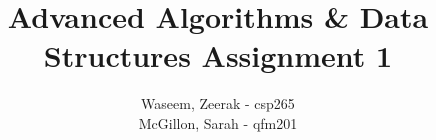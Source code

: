\title{Advanced Algorithms \& Data Structures Assignment 1}
\author{
  Waseem, Zeerak - csp265\\
  McGillon, Sarah - qfm201
}
\maketitle
